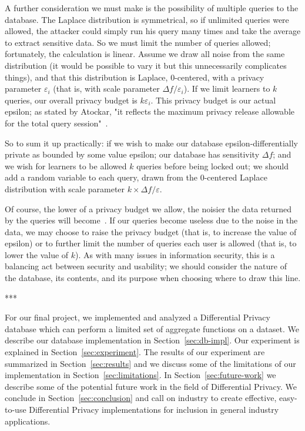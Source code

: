 \documentclass[conference,11pt]{IEEEtran}
\begin{document}
A further consideration we must make is the possibility of multiple
queries to the database. The Laplace distribution is symmetrical, so if
unlimited queries were allowed, the attacker could simply run his query many
times and take the average to extract sensitive data. So we must limit the
number of queries allowed; fortunately, the calculation is linear. Assume we
draw all noise from the same distribution (it would be possible to vary it but
this unnecessarily complicates things), and that this distribution is Laplace,
0-centered, with a privacy parameter $\varepsilon_i$ (that is, with scale
parameter ${\Delta}f/\varepsilon_i$). If we limit learners to $k$ queries, our
overall privacy budget is $k\varepsilon_i$. This privacy budget is our
actual epsilon; as stated by Atockar, "it reflects the maximum privacy release
allowable for the total query session"~\cite{Atockar:2014}.

So to sum it up practically: if we wish to make our database
epsilon-differentially private as bounded by some value epsilon; our database
has sensitivity ${\Delta}f$; and we wish for learners to be allowed $k$ queries
before being locked out; we should add a random variable to each query, drawn
from the 0-centered Laplace distribution with scale parameter $k \times
{\Delta}f/\varepsilon$.

Of course, the lower of a privacy budget we allow, the noisier the data returned
by the queries will become~\cite{Atockar:2014}. If our queries become useless
due to the noise in the data, we may choose to raise the privacy budget (that
is, to increase the value of epsilon) or to further limit the number of queries
each user is allowed (that is, to lower the value of $k$). As with many issues
in information security, this is a balancing act between security and usability;
we should consider the nature of the database, its contents, and its purpose
when choosing where to draw this line.

\begin{center}***\end{center}

For our final project, we implemented and analyzed a Differential Privacy
database which can perform a limited set of aggregate functions on a dataset.
We describe our database implementation in Section~\ref{sec:db-impl}. Our
experiment is explained in Section~\ref{sec:experiment}. The results of our
experiment are summarized in Section~\ref{sec:results} and we discuss some of
the limitations of our implementation in Section~\ref{sec:limitations}. In
Section~\ref{sec:future-work} we describe some of the potential future work in
the field of Differential Privacy. We conclude in Section~\ref{sec:conclusion}
and call on industry to create effective, easy-to-use Differential Privacy
implementations for inclusion in general industry applications.
\end{document}

